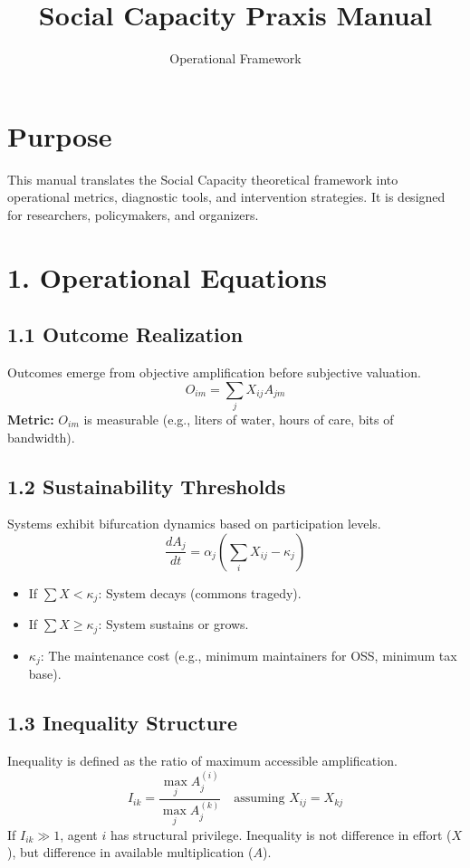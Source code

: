 \documentclass{article}
\title{\textbf{\sffamily Social Capacity Praxis Manual}}
\author{Operational Framework}
\date{}
\begin{document}
\maketitle

\section*{Purpose}
This manual translates the Social Capacity theoretical framework into operational metrics, diagnostic tools, and intervention strategies. It is designed for researchers, policymakers, and organizers.

\section*{1. Operational Equations}

\subsection*{1.1 Outcome Realization}
Outcomes emerge from objective amplification before subjective valuation.
\begin{equation}
O_{im} = \sum_j X_{ij} A_{jm}
\end{equation}
\textbf{Metric:} $O_{im}$ is measurable (e.g., liters of water, hours of care, bits of bandwidth).

\subsection*{1.2 Sustainability Thresholds}
Systems exhibit bifurcation dynamics based on participation levels.
\begin{equation}
\frac{dA_j}{dt} = \alpha_j \left( \sum_i X_{ij} - \kappa_j \right)
\end{equation}
\begin{itemize}
    \item If $\sum X < \kappa_j$: System decays (commons tragedy).
    \item If $\sum X \ge \kappa_j$: System sustains or grows.
    \item $\kappa_j$: The maintenance cost (e.g., minimum maintainers for OSS, minimum tax base).
\end{itemize}

\subsection*{1.3 Inequality Structure}
Inequality is defined as the ratio of maximum accessible amplification.
\begin{equation}
I_{ik} = \frac{\max_j A_j^{(i)}}{\max_j A_j^{(k)}} \quad \text{assuming } X_{ij} = X_{kj}
\end{equation}
If $I_{ik} \gg 1$, agent $i$ has structural privilege. Inequality is not difference in effort ($X$), but difference in available multiplication ($A$).
\end{document}
